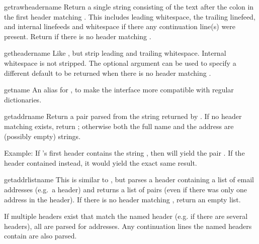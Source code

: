 \begin{methoddesc}{getrawheader}{name}
Return a single string consisting of the text after the colon in the
first header matching .  This includes leading whitespace,
the trailing linefeed, and internal linefeeds and whitespace if there
any continuation line(s) were present.  Return  if there is
no header matching .
\end{methoddesc}

\begin{methoddesc}{getheader}{name}
Like , but strip leading and trailing
whitespace.  Internal whitespace is not stripped.  The optional
 argument can be used to specify a different default to
be returned when there is no header matching .
\end{methoddesc}

\begin{methoddesc}{get}{name}
An alias for , to make the interface more compatible 
with regular dictionaries.
\end{methoddesc}

\begin{methoddesc}{getaddr}{name}
Return a pair  parsed
from the string returned by .  If no
header matching  exists, return ;
otherwise both the full name and the address are (possibly empty)
strings.

Example: If 's first  header contains the string
, then
 will yield the pair
.
If the header contained
 instead, it would yield the
exact same result.
\end{methoddesc}

\begin{methoddesc}{getaddrlist}{name}
This is similar to , but parses a header
containing a list of email addresses (e.g.\ a  header) and
returns a list of  pairs
(even if there was only one address in the header).  If there is no
header matching , return an empty list.

If multiple headers exist that match the named header (e.g. if there
are several  headers), all are parsed for addresses.  Any
continuation lines the named headers contain are also parsed.
\end{methoddesc}

